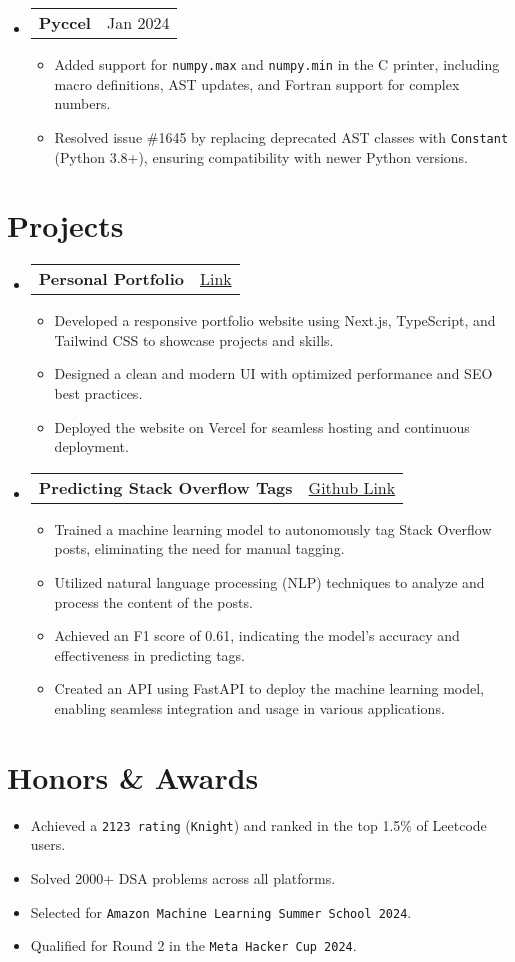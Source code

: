 \documentclass[letterpaper,11pt]{article}
\makeatletter
\newcommand{\resumeItem}[1]{
  \item\small{
    {#1 \vspace{-2pt}}
  }
}
\newcommand{\resumeProjectHeading}[2]{
    \item
    \begin{tabular*}{0.97\textwidth}{l@{\extracolsep{\fill}}r}
      \small#1 & #2 \\
    \end{tabular*}\vspace{-10pt} %
}
\newcommand{\resumeSubHeadingListStart}{\begin{itemize}[leftmargin=0.15in, label={}]}
\newcommand{\resumeSubHeadingListEnd}{\end{itemize}}
\newcommand{\resumeItemListStart}{\begin{itemize}}
\newcommand{\resumeItemListEnd}{\end{itemize}\vspace{-5pt}}
\makeatother
\begin{document}
\resumeSubHeadingListStart
    \resumeProjectHeading
    {\textbf{Pyccel}}{Jan 2024}
    \resumeItemListStart
        \resumeItem{Added support for \texttt{numpy.max} and \texttt{numpy.min} in the C printer, including macro definitions, AST updates, and Fortran support for complex numbers.}
        \resumeItem{Resolved issue \#1645 by replacing deprecated AST classes with \texttt{Constant} (Python 3.8+), ensuring compatibility with newer Python versions.}
    \resumeItemListEnd
\resumeSubHeadingListEnd

\section{Projects}
\resumeSubHeadingListStart
    \resumeProjectHeading
        {\textbf{Personal Portfolio}}{\href{https://priyabratamondal.com}{Link}}
    \resumeItemListStart
        \resumeItem{Developed a responsive portfolio website using Next.js, TypeScript, and Tailwind CSS to showcase projects and skills.}
        \resumeItem{Designed a clean and modern UI with optimized performance and SEO best practices.}
        \resumeItem{Deployed the website on Vercel for seamless hosting and continuous deployment.}
    \resumeItemListEnd
\resumeSubHeadingListEnd

\resumeSubHeadingListStart
    \resumeProjectHeading
            {\textbf{Predicting Stack Overflow Tags}}{\href{https://github.com/PriyabrataMo/predicting-stackoverflow-tags}{Github Link}}
            \resumeItemListStart
                \resumeItem{Trained a machine learning model to autonomously tag Stack Overflow posts, eliminating the need for manual tagging.}
                \resumeItem{Utilized natural language processing (NLP) techniques to analyze and process the content of the posts.}
                \resumeItem{Achieved an F1 score of 0.61, indicating the model's accuracy and effectiveness in predicting tags.}
                \resumeItem{Created an API using FastAPI to deploy the machine learning model, enabling seamless integration and usage in various applications.}
            \resumeItemListEnd
\resumeSubHeadingListEnd


\section{Honors \& Awards}
\resumeSubHeadingListStart
\resumeItem{Achieved a \texttt{2123 rating} (\texttt{Knight}) and ranked in the top 1.5\% of Leetcode users.}
\resumeItem{Solved 2000+ DSA problems across all platforms.}  
\resumeItem{Selected for \texttt{Amazon Machine Learning Summer School 2024}.}  
\resumeItem{Qualified for Round 2 in the \texttt{Meta Hacker Cup 2024}.}  

\resumeSubHeadingListEnd
\end{document}

